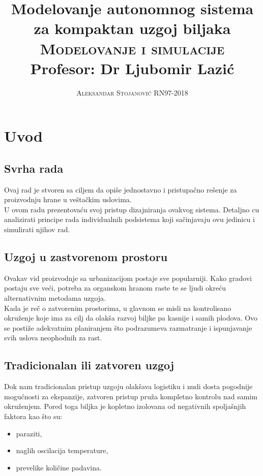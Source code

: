 \documentclass[a4paper,11pt]{book}
\title{\Huge \textbf{Modelovanje autonomnog sistema za kompaktan uzgoj biljaka} \\ \textsc{Modelovanje i simulacije} \\
\huge Profesor: Dr Ljubomir Lazić}
\author{\textsc{Aleksandar Stojanović RN97-2018}}
\begin{document}
\maketitle
\tableofcontents

\chapter*{Uvod}

\section*{Svrha rada}
Ovaj rad je stvoren sa ciljem da opiše jednostavno i pristupačno rešenje za proizvodnju hrane u veštačkim uslovima.\\

\noindent U ovom radu prezentovaću svoj pristup dizajniranja ovakvog sistema. Detaljno cu analizirati principe rada individualnih podsistema koji sačinjavaju ovu jedinicu i simulirati njihov rad.

\section*{Uzgoj u zastvorenom prostoru}
Ovakav vid proizvodnje sa urbanizacijom postaje sve popularniji. Kako gradovi postaju sve veći, potreba za organskom hranom raste te se ljudi okreću alternativnim metodama uzgoja.\\

Kada je reč o zatvorenim prostorima, u glavnom se misli na kontrolisano okruženje koje ima za cilj da olakša razvoj biljke pa kasnije i samih plodova. Ovo se postiže adekvatnim planiranjem što podrazumeva razmatranje i ispunjavanje svih uslova neophodnih za rast. 

\section*{Tradicionalan ili zatvoren uzgoj}
Dok nam tradicionalan pristup uzgoju olakšava logistiku i nudi dosta pogodnije mogućnosti za ekspanzije, zatvoren pristup pruža kompletno kontrolu nad samim okruženjem. Pored toga biljka je kopletno izolovana od negativnih spoljašnjih faktora kao što su:

\begin{itemize}
  \item paraziti,
  \item naglih oscilacija temperature,
  \item prevelike količine padavina.
\end{itemize}
\end{document}
